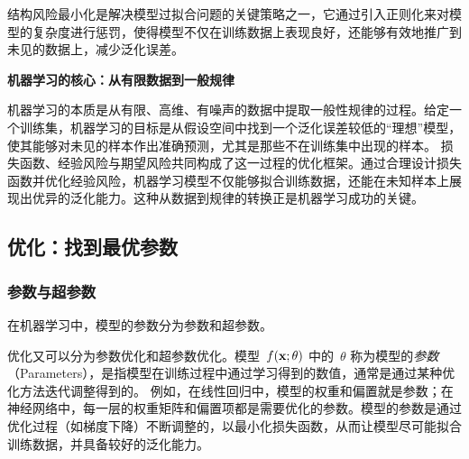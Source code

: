 结构风险最小化是解决模型过拟合问题的关键策略之一，它通过引入正则化来对模型的复杂度进行惩罚，使得模型不仅在训练数据上表现良好，还能够有效地推广到未见的数据上，减少泛化误差。


%

{\bf 机器学习的核心：从有限数据到一般规律}

机器学习的本质是从有限、高维、有噪声的数据中提取一般性规律的过程。给定一个训练集，机器学习的目标是从假设空间中找到一个泛化误差较低的“理想”模型，使其能够对未见的样本作出准确预测，尤其是那些不在训练集中出现的样本。
损失函数、经验风险与期望风险共同构成了这一过程的优化框架。通过合理设计损失函数并优化经验风险，机器学习模型不仅能够拟合训练数据，还能在未知样本上展现出优异的泛化能力。这种从数据到规律的转换正是机器学习成功的关键。


\subsection{优化：找到最优参数}

\subsubsection{参数与超参数}

在机器学习中，模型的参数分为参数和超参数。

优化又可以分为参数优化和超参数优化。模型~$f ({\bf x}; \theta)$ 中的~$\theta$ 称为模型的{\em 参数}（Parameters），是指模型在训练过程中通过学习得到的数值，通常是通过某种优化方法迭代调整得到的。
例如，在线性回归中，模型的权重和偏置就是参数；在神经网络中，每一层的权重矩阵和偏置项都是需要优化的参数。模型的参数是通过优化过程（如梯度下降）不断调整的，以最小化损失函数，从而让模型尽可能拟合训练数据，并具备较好的泛化能力。


